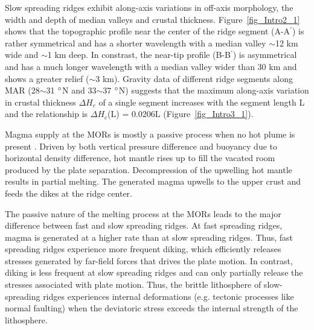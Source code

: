 Slow spreading ridges exhibit along-axis variations in off-axis morphology, the width and depth of median valleys and crustal thickness.  Figure~\ref{fig_Intro2_1} shows that the topographic profile near the center of the ridge segment (A-A$^{\prime}$) is rather symmetrical and has a shorter wavelength with a median valley $\sim$12 km wide and $\sim$1 km deep. In constrast, the near-tip profile (B-B$^{\prime}$) is asymmetrical and has a much longer wavelength with a median valley wider than 30 km and shows a greater relief ($\sim$3 km). Gravity data of different ridge segments along MAR (28$\sim$31 $\degree$N and 33$\sim$37 $\degree$N) suggests that the maximum along-axis variation in crustal thickness $\Delta H_{c}$ of a single segment increases with the segment length L \citep{Chen1999} and the relationship is $\Delta H_{c}$(L) = 0.0206L (Figure~\ref{fig_Intro3_1}).


%

Magma supply at the MORs is mostly a passive process when no hot plume is present \citep{Fowler2004}. Driven by both vertical pressure difference and buoyancy due to horizontal density difference, hot mantle rises up to fill the vacated room produced by the plate separation. Decompression of the upwelling hot mantle results in partial melting. The generated magma upwells to the upper crust and feeds the dikes at the ridge center. %

The passive nature of the melting process at the MORs leads to the major difference between fast and slow spreading ridges. At fast spreading ridges, magma is generated at a higher rate than at slow spreading ridges. Thus, fast spreading ridges experience more frequent diking, which efficiently releases stresses generated by far-field forces that drives the plate motion. In contrast, diking is less frequent at slow spreading ridges and can only partially release the stresses associated with plate motion. Thus, the brittle lithosphere of slow-spreading ridges experiences internal deformations (e.g. tectonic processes like normal faulting) when the deviatoric stress exceeds the internal strength of the lithosphere.

